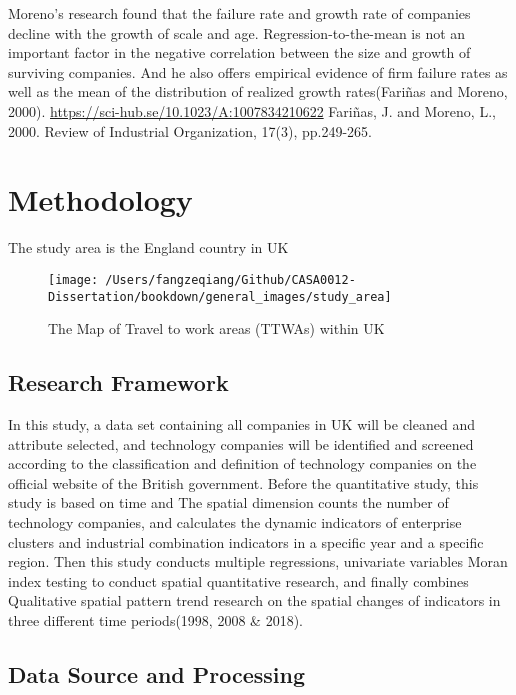 \documentclass[
  12pt,
  oneside]{book}
\begin{document}
Moreno's research found that the failure rate and growth rate of companies decline with the growth of scale and age. Regression-to-the-mean is not an important factor in the negative correlation between the size and growth of surviving companies. And he also offers empirical evidence of firm failure rates as well as the mean of the distribution of realized growth rates(Fariñas and Moreno, 2000).
\url{https://sci-hub.se/10.1023/A:1007834210622}
Fariñas, J. and Moreno, L., 2000. Review of Industrial Organization, 17(3), pp.249-265.

\hypertarget{methodology}{%
\chapter{Methodology}\label{methodology}}

The study area is the England country in UK

\begin{figure}
\texttt{[image: /Users/fangzeqiang/Github/CASA0012-Dissertation/bookdown/general\_images/study\_area]} \caption{The Map of Travel to work areas (TTWAs) within UK}\label{fig:fig-study-area}
\end{figure}

\hypertarget{research-framework}{%
\section{Research Framework}\label{research-framework}}

In this study, a data set containing all companies in UK will be cleaned and attribute selected, and technology companies will be identified and screened according to the classification and definition of technology companies on the official website of the British government. Before the quantitative study, this study is based on time and The spatial dimension counts the number of technology companies, and calculates the dynamic indicators of enterprise clusters and industrial combination indicators in a specific year and a specific region. Then this study conducts multiple regressions, univariate variables Moran index testing to conduct spatial quantitative research, and finally combines Qualitative spatial pattern trend research on the spatial changes of indicators in three different time periods(1998, 2008 \& 2018).

\hypertarget{data-source-and-processing}{%
\section{Data Source and Processing}\label{data-source-and-processing}}
\end{document}
